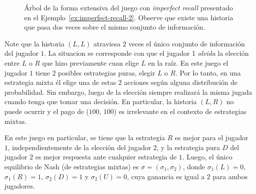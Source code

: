 \begin{figure}[h]
\begin{center}
\caption{Árbol de la forma extensiva del juego con \textit{imperfect recall} presentado en el Ejemplo~\ref{ex:imperfect-recall-2}. Observe que existe una historia que pasa dos veces sobre el mismo conjunto de información.}
\label{fig:imperfect-recall-2}
\end{center}
\end{figure}

Note que la historia $(L, L)$ atraviesa $2$ veces el único conjunto de información del jugador $1$. La situacion se corresponde con que el jugador 1 \textit{olvida} la elección entre $L$ o $R$ que hizo previamente cuan elige $L$ en la raíz. En este juego el jugador $1$ tiene $2$ posibles estrategias puras, elegir $L$ o $R$. Por lo tanto, en una estrategia mixta él elige una de estas $2$ acciones según alguna distribución de probabilidad. Sin embargo, luego de la elección siempre realizará la misma jugada cuando tenga que tomar una decisión. En particular, la historia $(L,R)$ no puede ocurrir y el pago de ($100$, $100$) es irrelevante en el contexto de estrategias mixtas.

En este juego en particular, se tiene que la estrategia $R$ es mejor para el jugador $1$, independientemente de la elección del jugador $2$, y la estrategia pura $D$ del jugador $2$ es mejor respuesta ante cualquier estrategia de $1$. Luego, el único equilibrio de Nash (de estrategias mixtas) es $\sigma = (\sigma_1, \sigma_2)$, donde $\sigma_1(L) = 0$, $\sigma_1(R) = 1$, $\sigma_2(D) = 1$ y $\sigma_2(U) = 0$, cuya ganancia es igual a $2$ para ambos jugadores.

